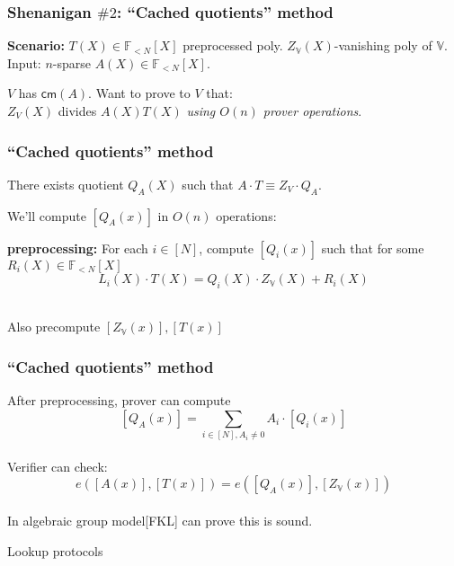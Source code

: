 \documentclass[shadesubsections,compress,14pt,mathserif]{beamer}
\newcommand{\F}{\ensuremath{{\mathbb F}}}
\newcommand{\enc}[1]{\ensuremath{\left[#1\right ]}}
\newcommand{\kzg}[1]{\ensuremath{\enc{#1(x)}}}
\newcommand{\cm}{\ensuremath{\mathsf{cm}}}
\newcommand{\polysofdeg}[1]{\F_{< #1}[X]}
\newcommand{\nl}{\\ \pause \vspace{0.2in}}
\newcommand{\bigspace}{\ensuremath{\mathbb{V}}}
\begin{document}
\begin{frame}
 \frametitle{Shenanigan $\#2$: ``Cached quotients'' method}
 \textbf{Scenario:}
$T(X)\in \polysofdeg{N}$ preprocessed poly.
$Z_\bigspace(X)$-vanishing poly of $\bigspace$.\\
Input: $n$-sparse $A(X)\in\polysofdeg{N}$.\nl

$V$ has $\cm(A)$. Want to prove to $V$ that:\\
$Z_V(X)$ divides $A(X)T(X)$ \textit{using $O(n)$ prover operations}.

\end{frame}
\begin{frame}
\frametitle{``Cached quotients'' method}
There exists quotient $Q_A(X)$ such that $A\cdot T\equiv Z_V\cdot Q_A$.\nl

We'll compute $\kzg{Q_A}$ in $O(n)$ operations:\nl


\textbf{preprocessing:}
For each $i\in [N]$, compute $\kzg{Q_i}$ such that for some $R_i(X)\in \polysofdeg{N}$
\[L_i(X)\cdot T(X) = Q_i(X)\cdot Z_\bigspace(X) +R_i(X)\]\nl

Also precompute $\kzg{Z_\bigspace},\kzg{T}$
\end{frame}
\begin{frame}
\frametitle{``Cached quotients'' method}
After preprocessing, prover can compute
\[\kzg{Q_A}=\sum_{i\in [N],A_i\neq 0} A_i \cdot \kzg{Q_i}\]\nl
Verifier can check:
\[e(\kzg{A},\kzg{T})=e(\kzg{Q_A},\kzg{Z_{\bigspace}})\]\nl
In algebraic group model[FKL] can prove this is sound.
\end{frame}

    

\begin{frame}
{\huge{Lookup protocols}}
 \end{frame}
\end{document}
